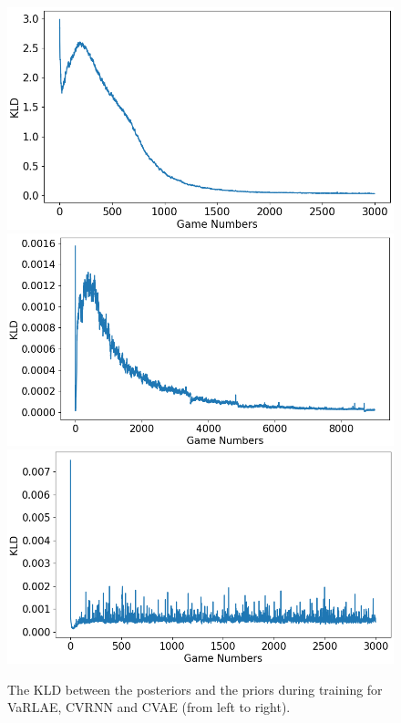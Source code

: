\documentclass{article}
\newcommand{\system}{VaRLAE\;}
\begin{document}
\begin{figure}[!htbp]
    \centering
    {{\includegraphics[width=0.32\columnwidth]{figures/kld_clvrnn_plot.png} }}%
    {{\includegraphics[width=0.32\columnwidth]{figures/kld_cvrnn_plot.png} }}%
    {{\includegraphics[width=0.32\columnwidth]{figures/kld_cvae_plot.png} }}
    \caption{The KLD between the posteriors and the priors during training for \system, CVRNN and CVAE (from left to right).}
    \label{fig:kld}
\end{figure}



\end{document}
